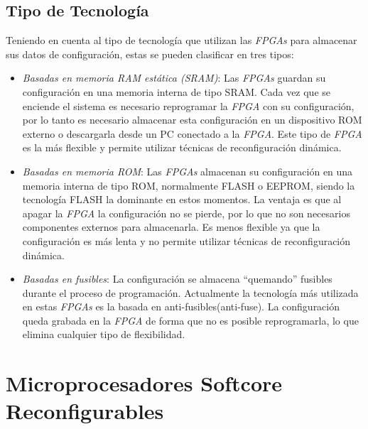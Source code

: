 	\subsection{Tipo de Tecnología} 
	Teniendo en cuenta al tipo de tecnología que utilizan las \textit{FPGAs} para almacenar sus datos de configuración, estas se pueden clasificar en
	tres tipos:

	\begin {itemize}
	\item  
	\textit {Basadas en memoria RAM estática (SRAM)}: Las \textit{FPGAs} guardan su configuración en una memoria interna de tipo SRAM. Cada vez que se
	enciende el sistema es necesario reprogramar la \textit{FPGA} con su configuración, por lo tanto es necesario almacenar esta configuración en un
	dispositivo ROM externo o descargarla desde un PC conectado a la \textit{FPGA}. Este tipo de \textit{FPGA} es la más flexible y permite utilizar
	técnicas de reconfiguración dinámica.
	\item  
	\textit{Basadas en memoria ROM}: Las \textit{FPGAs} almacenan su configuración en una memoria interna de tipo ROM, normalmente FLASH o EEPROM, siendo
	la tecnología FLASH la dominante en estos momentos. La ventaja es que al apagar la \textit{FPGA} la configuración no se pierde, por lo que no son
	necesarios componentes externos para almacenarla. Es menos flexible ya que la configuración es más lenta y no permite utilizar técnicas de
	reconfiguración dinámica.
	\item  
	\textit{Basadas en fusibles}: La configuración se almacena “quemando” fusibles durante el proceso de programación. Actualmente la tecnología más
	utilizada en estas \textit{FPGAs} es la basada en anti-fusibles(anti-fuse). La configuración queda grabada en la \textit{FPGA} de forma que no es
	posible reprogramarla, lo que elimina cualquier tipo de flexibilidad.
 	\end {itemize}

\section{Microprocesadores Softcore Reconfigurables}
